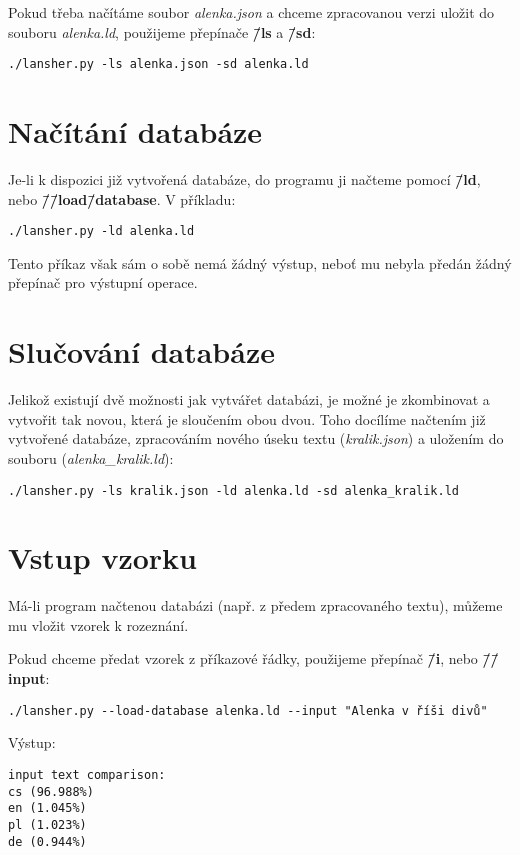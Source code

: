 \documentclass[11pt]{article}
\begin{document}
Pokud třeba načítáme soubor \textit{alenka.json} a chceme zpracovanou verzi uložit do souboru \textit{alenka.ld}, použijeme přepínače \textbf{\=/ls} a \textbf{\=/sd}:
\begin{lstlisting}
./lansher.py -ls alenka.json -sd alenka.ld
\end{lstlisting}

\section{Načítání databáze}
Je-li k dispozici již vytvořená databáze, do programu ji načteme pomocí \textbf{\=/ld}, nebo \textbf{\=/\=/load\=/database}. V příkladu:
\begin{lstlisting}
./lansher.py -ld alenka.ld
\end{lstlisting}

Tento příkaz však sám o sobě nemá žádný výstup, neboť mu nebyla předán žádný přepínač pro výstupní operace.

\section{Slučování databáze}
Jelikož existují dvě možnosti jak vytvářet databázi, je možné je zkombinovat a vytvořit tak novou, která je sloučením obou dvou. Toho docílíme načtením již vytvořené databáze, zpracováním nového úseku textu (\textit{kralik.json}) a uložením do souboru (\textit{alenka\_kralik.ld}):

\begin{lstlisting}
./lansher.py -ls kralik.json -ld alenka.ld -sd alenka_kralik.ld
\end{lstlisting}


\section{Vstup vzorku}
Má-li program načtenou databázi (např. z předem zpracovaného textu), můžeme mu vložit vzorek k rozeznání.

Pokud chceme předat vzorek z příkazové řádky, použijeme přepínač \textbf{\=/i}, nebo \textbf{\=/\=/input}:
\begin{lstlisting}
./lansher.py --load-database alenka.ld --input "Alenka v říši divů"
\end{lstlisting}

Výstup:
\begin{lstlisting}
input text comparison:
cs (96.988%)
en (1.045%)
pl (1.023%)
de (0.944%)
\end{lstlisting}
\end{document}
